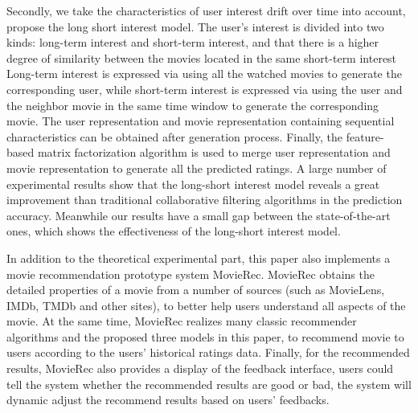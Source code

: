 \begin{eabstract}
Secondly, we take the characteristics of user interest drift over time into account,
propose the long short interest model. The user's interest is divided into two kinds: long-term interest and short-term interest,
and that there is a higher degree of similarity between the movies located in the same short-term interest
Long-term interest is expressed via using all the watched movies to generate the corresponding user,
while short-term interest is expressed via using the user and the neighbor movie
in the same time window to generate the corresponding movie.
The user representation and movie representation containing sequential characteristics can be obtained after generation process.
Finally, the feature-based matrix factorization algorithm is used to merge user representation
and movie representation to generate all the predicted ratings.
A large number of experimental results show that the long-short interest model reveals
a great improvement than traditional collaborative filtering algorithms in the prediction accuracy.
Meanwhile our results have a small gap between the state-of-the-art ones,
which shows the effectiveness of the long-short interest model.

In addition to the theoretical experimental part, this paper also implements a movie recommendation prototype system MovieRec. MovieRec obtains the detailed properties of a movie from a number of sources (such as MovieLens, IMDb, TMDb and other sites),
to better help users understand all aspects of the movie.
At the same time, MovieRec realizes many classic recommender algorithms and the proposed three models in this paper,
to recommend movie to users according to the users' historical ratings data.
Finally, for the recommended results, MovieRec also provides a display of the feedback interface,
users could tell the system whether the recommended results are good or bad,
the system will dynamic adjust the recommend results based on users' feedbacks.
\end{eabstract}


